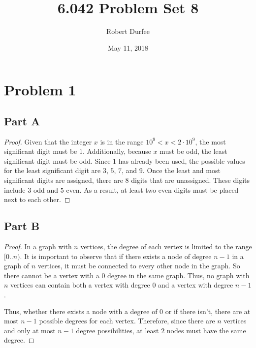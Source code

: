 \documentclass{article}
\title{6.042 Problem Set 8}
\author{Robert Durfee}
\date{May 11, 2018}
\begin{document}
\maketitle

\section*{Problem 1}

\subsection*{Part A}

\begin{proof}

  Given that the integer $x$ is in the range $10^9 < x < 2 \cdot 10^9$, the most
  significant digit must be $1$. Additionally, because $x$ must be odd, the
  least significant digit must be odd. Since $1$ has already been used,
  the possible values for the least significant digit are $3$, $5$, $7$, and
  $9$. Once the least and most significant digits are assigned, there are 8
  digits that are unassigned. These digits include $3$ odd and $5$ even. As a
  result, at least two even digits must be placed next to each other.

\end{proof}

\break

\subsection*{Part B}

\begin{proof}

  In a graph with $n$ vertices, the degree of each vertex is limited to the
  range $[0..n)$. It is important to observe that if there exists a node of
  degree $n-1$ in a graph of $n$ vertices, it must be connected to every other
  node in the graph. So there cannot be a vertex with a $0$ degree in the
  same graph. Thus, no graph with $n$ vertices can contain both a vertex
  with degree $0$ and a vertex with degree $n-1$.

  Thus, whether there exists a node with a degree of $0$ or if there isn't,
  there are at most $n - 1$ possible degrees for each vertex. Therefore, since
  there are $n$ vertices and only at most $n - 1$ degree possibilities, at least
  $2$ nodes must have the same degree.

\end{proof}
\end{document}
